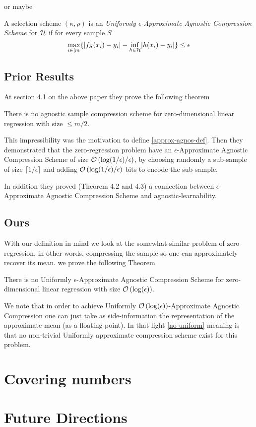 \documentclass{article}
\begin{document}
or maybe 

\begin{definition}
A selection scheme $(\kappa,\rho)$ 
is an \emph{Uniformly $\epsilon$-Approximate Agnostic Compression Scheme} for $\mathcal{H}$ 
if for every sample $S$
\[ \max_{i\in [m} \{
    \lvert f_S (x_i) - y_i\rvert - \inf_{h\in\mathcal{H}} \lvert h (x_i) - y_i\rvert 
    \}
\leq \epsilon \]
\end{definition}

\subsection{Prior Results}

At section 4.1 on the above paper they prove the following theorem

\begin{theorem*}[Theorem 4.1]
There is no agnostic sample compression scheme for zero-dimensional linear regression with size $\leq m/2$.
\end{theorem*}

This impressibility was the motivation to define \ref{approx-agnos-def}. Then they demonstrated that the zero-regression problem have an $\epsilon$-Approximate Agnostic Compression Scheme of size $\mathcal{O}\left(\log(1/\epsilon)/\epsilon\right)$, by choosing randomly a sub-sample of size $\lceil 1/\epsilon \rceil$ 
and adding $\mathcal{O}\left(\log(1/\epsilon)/\epsilon\right)$ bits to encode the sub-sample.

In addition they proved (Theorem 4.2 and 4.3) a connection between $\epsilon$-Approximate Agnostic Compression Scheme and agnostic-learnability.

\subsection{Ours}

With our definition in mind we look at the somewhat similar problem of zero-regression, in other words, compressing the sample so one can approximately recover its mean.
we prove the following Theorem

\begin{theorem} \label{no-uniform}
There is no Uniformly $\epsilon$-Approximate Agnostic Compression Scheme for zero-dimensional linear regression with size 
$ \mathcal{O}\left(\log(\epsilon)\right) $.
\end{theorem}

We note that in order to achieve Uniformly $ \mathcal{O}\left(\log(\epsilon)\right) $-Approximate Agnostic Compression 
one can just take as side-information the representation of the approximate mean  (as a floating point).
In that light \ref{no-uniform} meaning is that no non-trivial Uniformly approximate compression scheme exist for this problem.

\section{Covering numbers}

\section{Future Directions}



\end{document}
